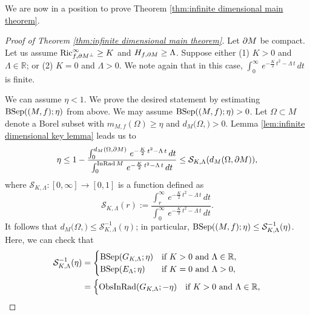 We are now in a position to prove Theorem \ref{thm:infinite dimensional main theorem}.
\begin{proof}[Proof of Theorem \ref{thm:infinite dimensional main theorem}]
Let $\partial M$ be compact.
Let us assume $\operatorname{Ric}^{\infty}_{f,\partial M^{\perp}}\geq K$ and $H_{f,\partial M}\geq \Lambda$.
Suppose either (1) $K>0$ and $\Lambda \in \mathbb{R}$;
or (2) $K=0$ and $\Lambda >0$.
We note again that
in this case,
$\int^{\infty}_{0}\,e^{-\frac{K}{2}\,t^{2}-\Lambda\,t}\,dt$ is finite.

We can assume $\eta<1$.
We prove the desired statement by estimating $\operatorname{BSep}((M,f);\eta)$ from above.
We may assume $\operatorname{BSep}((M,f);\eta)>0$.
Let $\Omega \subset M$ denote a Borel subset with $m_{M,f}(\Omega)\geq \eta$ and $d_{M}(\Omega,\bm)>0$.
Lemma \ref{lem:infinite dimensional key lemma} leads us to
\begin{equation*}
\eta \leq 1-\frac{\int^{d_{M}(\Omega,\partial M)}_{0}\,e^{-\frac{K}{2}\,t^{2}-\Lambda\,t} \,dt}{\int^{\operatorname{InRad} M}_{0}\,e^{-\frac{K}{2}\,t^{2}-\Lambda\,t} \,dt}
       \leq \mathcal{S}_{K,\Lambda}(d_{M}(\Omega,\partial M)),
\end{equation*}
where $\mathcal{S}_{K,\Lambda}:[0,\infty]\to [0,1]$ is a function defined as
\begin{equation*}
\mathcal{S}_{K,\Lambda}(r):=\frac{\int^{\infty}_{r}\,  e^{-\frac{K}{2}\,t^{2}-\Lambda\,t} \,dt}{\int^{\infty}_{0}\,e^{-\frac{K}{2}\,t^{2}-\Lambda\,t}\,dt}.
\end{equation*}
It follows that $d_{M}(\Omega,\bm) \leq \mathcal{S}^{-1}_{K,\Lambda}(\eta)$;
in particular,
$\operatorname{BSep}((M,f);\eta)\leq \mathcal{S}^{-1}_{K,\Lambda}(\eta)$.
Here,
we can check that
\begin{align}\label{eq:calculation of infinite dimensional model}
\mathcal{S}^{-1}_{K,\Lambda}(\eta)&=\begin{cases}
                                                           \operatorname{BSep}(G_{K,\Lambda};\eta) & \text{if $K>0$ and $\Lambda \in \mathbb{R}$}, \\
                                                           \operatorname{BSep}(E_{\Lambda};\eta)     & \text{if $K=0$ and $\Lambda>0$},
                                                           \end{cases}\\ \notag
                                                        &=\begin{cases}
                                                           \operatorname{ObsInRad}(G_{K,\Lambda};-\eta) & \text{if $K>0$ and $\Lambda \in \mathbb{R}$}, \\

\end{cases}
\end{align}
\end{proof}
